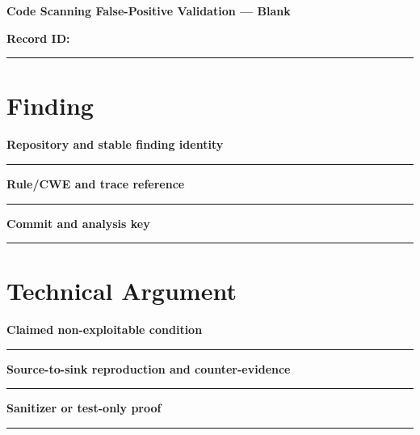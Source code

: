 \documentclass[11pt,letterpaper]{article}
\begin{document}
\begin{center}{\LARGE\bfseries Code Scanning False-Positive Validation --- Blank}\par
\vspace{4pt}{\small Print-ready unfilled assessment instrument}\par
\end{center}
\noindent\textbf{Record ID:} \rule{2.6in}{0.4pt}\par
\section{Finding}
\noindent\textbf{Repository and stable finding identity}\par
\vspace{1.1em}\noindent\rule{0.96\linewidth}{0.4pt}\par\vspace{0.65em}
\noindent\textbf{Rule/CWE and trace reference}\par
\vspace{1.1em}\noindent\rule{0.96\linewidth}{0.4pt}\par\vspace{0.65em}
\noindent\textbf{Commit and analysis key}\par
\vspace{1.1em}\noindent\rule{0.96\linewidth}{0.4pt}\par\vspace{0.65em}
\section{Technical Argument}
\noindent\textbf{Claimed non-exploitable condition}\par
\vspace{1.1em}\noindent\rule{0.96\linewidth}{0.4pt}\par\vspace{0.65em}
\noindent\textbf{Source-to-sink reproduction and counter-evidence}\par
\vspace{1.1em}\noindent\rule{0.96\linewidth}{0.4pt}\par\vspace{0.65em}
\noindent\textbf{Sanitizer or test-only proof}\par
\vspace{1.1em}\noindent\rule{0.96\linewidth}{0.4pt}\par\vspace{0.65em}
\end{document}
